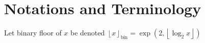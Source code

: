 \section{Notations and Terminology} \label{sec:notation}

Let binary floor of $x$ be denoted $\left\lfloor x \right\rfloor_\mathrm{bin} = \exp(2, \left\lfloor \log_2 x \right\rfloor)$
